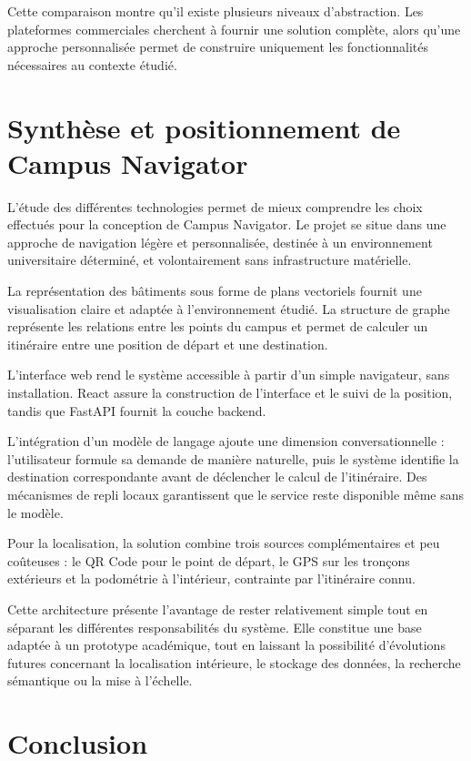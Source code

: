 \documentclass[12pt,a4paper]{report}
\begin{document}
Cette comparaison montre qu'il existe plusieurs niveaux d'abstraction. Les plateformes commerciales
cherchent à fournir une solution complète, alors qu'une approche personnalisée permet de
construire uniquement les fonctionnalités nécessaires au contexte étudié.

\section{Synthèse et positionnement de Campus Navigator}

L'étude des différentes technologies permet de mieux comprendre les choix effectués pour la
conception de Campus Navigator. Le projet se situe dans une approche de navigation légère et
personnalisée, destinée à un environnement universitaire déterminé, et volontairement sans
infrastructure matérielle.

La représentation des bâtiments sous forme de plans vectoriels fournit une visualisation claire et
adaptée à l'environnement étudié. La structure de graphe représente les relations entre les points
du campus et permet de calculer un itinéraire entre une position de départ et une destination.

L'interface web rend le système accessible à partir d'un simple navigateur, sans installation.
React assure la construction de l'interface et le suivi de la position, tandis que FastAPI fournit
la couche backend.

L'intégration d'un modèle de langage ajoute une dimension conversationnelle : l'utilisateur
formule sa demande de manière naturelle, puis le système identifie la destination correspondante
avant de déclencher le calcul de l'itinéraire. Des mécanismes de repli locaux garantissent que le
service reste disponible même sans le modèle.

Pour la localisation, la solution combine trois sources complémentaires et peu coûteuses : le QR
Code pour le point de départ, le GPS sur les tronçons extérieurs et la podométrie à l'intérieur,
contrainte par l'itinéraire connu.

Cette architecture présente l'avantage de rester relativement simple tout en séparant les
différentes responsabilités du système. Elle constitue une base adaptée à un prototype académique,
tout en laissant la possibilité d'évolutions futures concernant la localisation intérieure, le
stockage des données, la recherche sémantique ou la mise à l'échelle.

\section{Conclusion}
\end{document}
